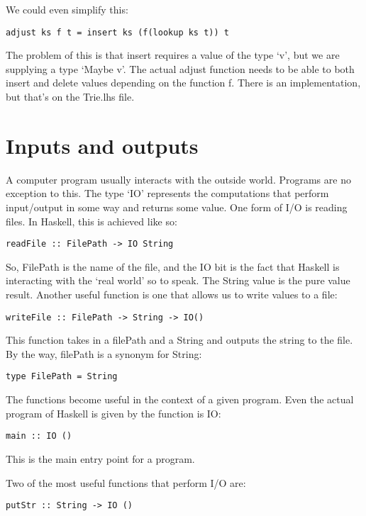 \documentclass[11pt,a4paper,titlepage,dvipsnames,cmyk]{scrartcl}
\begin{document}
We could even simplify this:
\begin{lstlisting}[style=B]
adjust ks f t = insert ks (f(lookup ks t)) t
\end{lstlisting}

The problem of this is that insert requires a value of the type `v', but
we are supplying a type `Maybe v'. The actual adjust function needs to be
able to both insert and delete values depending on the function f. There
is an implementation, but that's on the Trie.lhs file.

\section{Inputs and outputs}%
\label{sec:i/o}

A computer program usually interacts with the outside world. Programs are
no exception to this. The type `IO' represents the computations that
perform input/output in some way and returns some value. One form of I/O
is reading files. In Haskell, this is achieved like so:
\begin{lstlisting}[style=B]
readFile :: FilePath -> IO String
\end{lstlisting}
So, FilePath is the name of the file, and the IO bit is the fact that
Haskell is interacting with the `real world' so to speak. The String value
is the pure value result.
Another useful function is one that allows us to write values to a file:
\begin{lstlisting}[style=B]
writeFile :: FilePath -> String -> IO()
\end{lstlisting}

This function takes in a filePath and a String and outputs the string to
the file. By the way, filePath is a synonym for String:
\begin{lstlisting}[style=B]
type FilePath = String
\end{lstlisting}

The functions become useful in the context of a given program. Even the
actual program of Haskell is given by the function is IO:
\begin{lstlisting}[style=B]
main :: IO ()
\end{lstlisting}

This is the main entry point for a program.

Two of the most useful functions that perform I/O are:
\begin{lstlisting}[style=B]
putStr :: String -> IO ()
\end{lstlisting}
\end{document}
